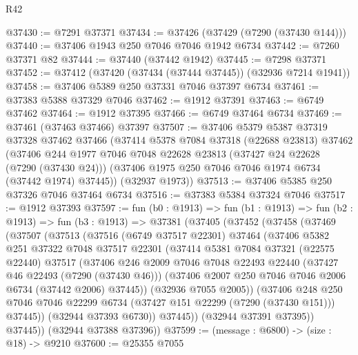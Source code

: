 \begin{lexlean}{R42}
\begin{coremodule}
{@37430 := @7291 @37371
@37434 := @37426 (@37429 (@7290 (@37430 @144)))
@37440 := @37406 @1943 @250 @7046 @7046 @1942 @6734
@37442 := @7260 @37371 @82
@37444 := @37440 (@37442 @1942)
@37445 := @7298 @37371
@37452 := @37412 (@37420 (@37434 (@37444 @37445)) (@32936 @7214 @1941))
@37458 := @37406 @5389 @250 @37331 @7046 @37397 @6734
@37461 := @37383 @5388 @37329 @7046
@37462 := @1912 @37391
@37463 := @6749 @37462
@37464 := @1912 @37395
@37466 := @6749 @37464 @6734
@37469 := @37461 (@37463 @37466) @37397
@37507 := @37406
    @5379
    @5387
    @37319
    @37328
    @37462
    @37466
    (@37414
      @5378
      @7084
      @37318
      (@22688 @23813)
      @37462
      (@37406
        @244
        @1977
        @7046
        @7048
        @22628
        @23813
        (@37427 @24 @22628 (@7290 (@37430 @24)))
        (@37406 @1975 @250 @7046 @7046 @1974 @6734 (@37442 @1974) @37445))
      (@32937 @1973))
@37513 := @37406 @5385 @250 @37326 @7046 @37464 @6734
@37516 := @37383 @5384 @37324 @7046
@37517 := @1912 @37393
@37597 := fun (b0 : @1913) =>
  fun (b1 : @1913) =>
  fun (b2 : @1913) =>
  fun (b3 : @1913) =>
  @37381
    (@37405
      (@37452
        (@37458
          (@37469
            (@37507
              (@37513
                (@37516
                  (@6749 @37517 @22301)
                  @37464
                  (@37406
                    @5382
                    @251
                    @37322
                    @7048
                    @37517
                    @22301
                    (@37414
                      @5381
                      @7084
                      @37321
                      (@22575 @22440)
                      @37517
                      (@37406
                        @246
                        @2009
                        @7046
                        @7048
                        @22493
                        @22440
                        (@37427 @46 @22493 (@7290 (@37430 @46)))
                        (@37406 @2007 @250 @7046 @7046 @2006 @6734 (@37442 @2006) @37445))
                      (@32936 @7055 @2005))
                    (@37406
                      @248
                      @250
                      @7046
                      @7046
                      @22299
                      @6734
                      (@37427 @151 @22299 (@7290 (@37430 @151)))
                      @37445))
                  (@32944 @37393 @6730))
                @37445))
            (@32944 @37391 @37395))
          @37445))
      (@32944 @37388 @37396))
@37599 := (message : @6800) -> (size : @18) -> @9210
@37600 := @25355 @7055
}
\end{coremodule}
\end{lexlean}
